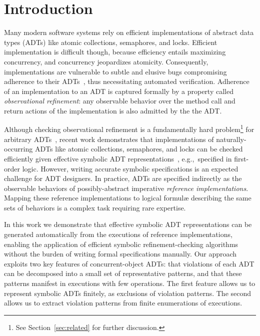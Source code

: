 \section{Introduction}
\label{sec:intro}

Many modern software systems rely on efficient implementations of abstract data
types (ADTs) like atomic collections, semaphores, and locks. Efficient
implementation is difficult though, because efficiency entails maximizing
concurrency, and concurrency jeopardizes atomicity. Consequently,
implementations are vulnerable to subtle and elusive bugs compromising
adherence to their ADTs~\cite{journals/cacm/staff11}, thus necessitating
automated verification. Adherence of an implementation to an ADT is captured
formally by a property called \emph{observational refinement}: any observable
behavior over the method call and return actions of the implementation is also
admitted by the the ADT.

Although checking observational refinement is a fundamentally hard
problem\footnote{See Section~\ref{sec:related} for further discussion.} for
arbitrary ADTs~\cite{journals/siamcomp/GibbonsK97, conf/esop/BouajjaniEEH13},
recent work demonstrates that implementations of naturally-occurring ADTs like
atomic collections, semaphores, and locks can be checked efficiently given
effective symbolic ADT representations~\cite{conf/popl/BouajjaniEEH15,
journals/arxiv/BouajjaniEEH15, conf/pldi/EmmiEH15}, e.g.,~specified in
first-order logic. However, writing accurate symbolic specifications is an
expected challenge for ADT designers. In practice, ADTs are specified
indirectly as the observable behaviors of possibly-abstract imperative
\emph{reference implementations}. Mapping these reference implementations to
logical formulæ describing the same sets of behaviors is a complex task
requiring rare expertise.

In this work we demonstrate that effective symbolic ADT representations can be
generated automatically from the executions of reference implementations,
enabling the application of efficient symbolic refinement-checking algorithms
without the burden of writing formal specifications manually. Our approach
exploits two key features of concurrent-object ADTs: that violations of each
ADT can be decomposed into a small set of representative patterns, and that
these patterns manifest in executions with few operations. The first feature
allows us to represent symbolic ADTs finitely, as exclusions of violation
patterns. The second allows us to extract violation patterns from finite
enumerations of executions.

